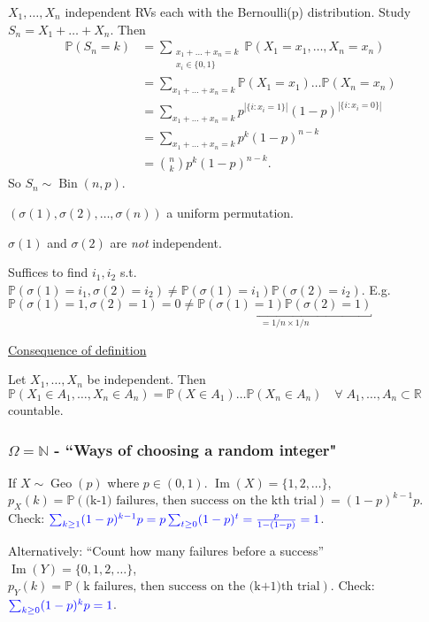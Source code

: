 \begin{example}
    $X_1, \dots, X_n$ independent RVs each with the Bernoulli(p) distribution.
    Study $S_n = X_1 + \dots + X_n$.
    Then 
    \begin{align*}
        \mathbb{P}(S_n = k) &= \sum_{\substack{x_1 + \dots + x_n = k \\ x_i \in \{0, 1\} }}\mathbb{P}(X_1 = x_1, \dots, X_n = x_n) \\
        &= \sum_{x_1 + \dots + x_n = k} \mathbb{P}(X_1 = x_1) \dots \mathbb{P}(X_n = x_n) \\
        &= \sum_{x_1 + \dots + x_n = k} p^{|\{i : x_i = 1\}|} (1 - p)^{|\{i : x_i = 0\}|} \\
        &= \sum_{x_1 + \dots + x_n = k} p^k (1-p)^{n - k} \\
        &= \binom{n}{k} p^k (1-p)^{n - k}.
    \end{align*} 
    So $S_n \sim \operatorname{Bin}(n, p)$.
\end{example} 

\begin{example}
    $(\sigma(1), \sigma(2), \dots, \sigma(n))$ a uniform permutation.
    \begin{claim}
        $\sigma(1)$ and $\sigma(2)$ are \emph{not} independent.
    \end{claim} 
    Suffices to find $i_1, i_2$ s.t. $\mathbb{P}(\sigma(1) = i_1, \sigma(2) = i_2) \neq \mathbb{P}(\sigma(1) = i_1) \mathbb{P}(\sigma(2) = i_2)$.
    E.g. $\mathbb{P}(\sigma(1) = 1, \sigma(2) = 1) = 0 \neq \underbracket{\mathbb{P}(\sigma(1) = 1) \mathbb{P}(\sigma(2) = 1)}_{= 1 / n \times 1 /n}$
\end{example} 

\underline{Consequence of definition}

Let $X_1, \dots, X_n$ be independent.
Then $\mathbb{P}(X_1 \in A_1, \dots, X_n \in A_n) = \mathbb{P}(X \in A_1) \dots \mathbb{P}(X_n \in A_n) \quad \forall \; A_1, \dots, A_n \subset \mathbb{R}$ countable.

\subsubsection{$\Omega = \mathbb{N}$ - ``Ways of choosing a random integer"}

\begin{definition}  
    If $X \sim \operatorname{Geo}(p)$ where $p \in (0, 1)$.
    $\operatorname{Im}(X) = \{1, 2, \dots\}$, \\
    $p_X(k) = \mathbb{P}(\text{(k-1) failures, then success on the kth trial}) = (1-p)^{k-1}p$.
    \color{blue} Check: $\mathcolor{blue}{\sum_{k \geq 1} (1-p)^{k - 1} p = p \sum_{t \geq 0} (1-p)^t = \frac{p}{1 - (1 - p)} = 1}$.\color{black}

    Alternatively: ``Count how many failures before a success'' \\
    $\operatorname{Im}(Y) = \{0, 1, 2, \dots\}$, $p_Y(k) = \mathbb{P}(\text{k failures, then success on the (k+1)th trial})$.
    \color{blue} Check: $\mathcolor{blue}{\sum_{k \geq 0} (1-p)^{k} p = 1}$.\color{black}
\end{definition}    

